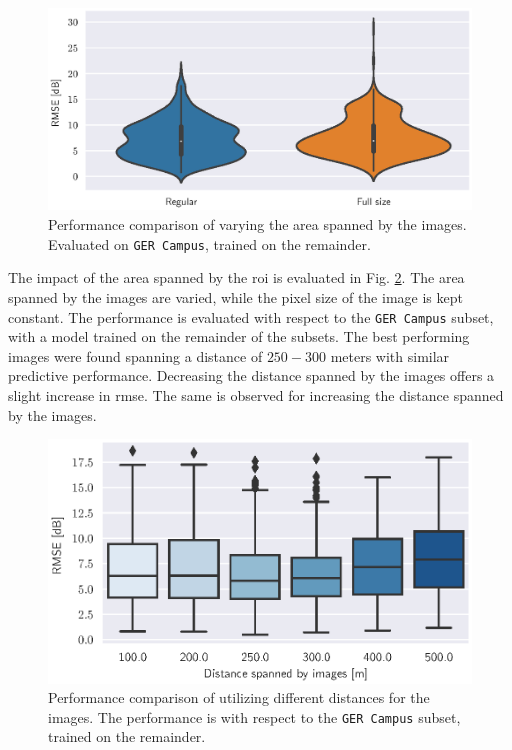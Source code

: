 \begin{figure}[h]
    \centering
    \includegraphics{chapters/part_pathloss/osm_images_paper/figures/RMSE_violin.eps}
    \caption{Performance comparison of varying the area spanned by the images. Evaluated on \texttt{GER Campus}, trained on the remainder.}
    \label{fig:rmse_violin_image_comparison}
\end{figure}


The impact of the area spanned by the \gls{roi} is evaluated in Fig. \ref{fig:boxplot_ci_image_distance}. The area spanned by the images are varied, while the pixel size of the image is kept constant. The performance is evaluated with respect to the \texttt{GER Campus} subset, with a model trained on the remainder of the subsets. The best performing images were found spanning a distance of $250-300$ meters with similar predictive performance. Decreasing the distance spanned by the images offers a slight increase in \gls{rmse}. The same is observed for increasing the distance spanned by the images.

\begin{figure}
    \centering
    \includegraphics{chapters/part_pathloss/osm_images_paper/figures/boxplot_ci_image_distance.eps}
    \caption{Performance comparison of utilizing different distances for the images. The performance is with respect to the \texttt{GER Campus} subset, trained on the remainder.}
    \label{fig:boxplot_ci_image_distance}
\end{figure}

